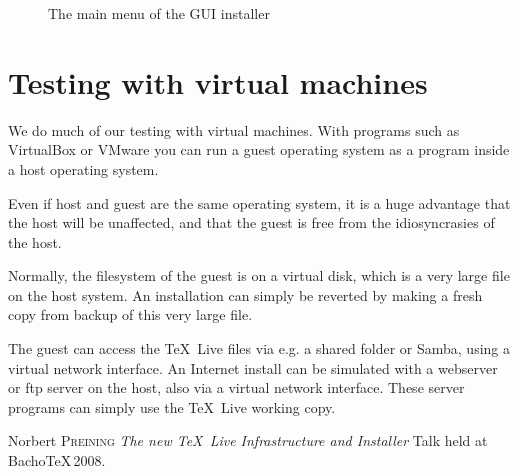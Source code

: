\documentclass{ltugproc}
\newcommand{\tl}{\TeX~Live}
\begin{document}
\begin{figure}[htb]
  \centering
  \caption{The main menu of the GUI installer}
  \label{fig:gui_main_menu}
\end{figure}

\section{Testing with virtual machines}
We do much of our testing with virtual machines. With programs such
as VirtualBox or VMware you can run a guest operating system as a
program inside a host operating system.

Even if host and guest are the same operating system, it is a huge
advantage that the host will be unaffected, and that the guest is
free from the idiosyncrasies of the host.

Normally, the filesystem of the guest is on a virtual disk, which is
a very large file on the host system.  An installation can simply be
reverted by making a fresh copy from backup of this very large file.

The guest can access the \tl{} files via e.g. a shared folder or
Samba, using a virtual network interface. An Internet install can be
simulated with a webserver or ftp server on the host, also via a
virtual network interface. These server programs can simply use the
\tl{} working copy.

\newpage
\begin{thebibliography}{1}
 Norbert \textsc{Preining}
\newblock \emph{The new \TeX~Live Infrastructure and Installer}
Talk held at Bacho\TeX\,2008.
\end{thebibliography}

%
%

\end{document}

